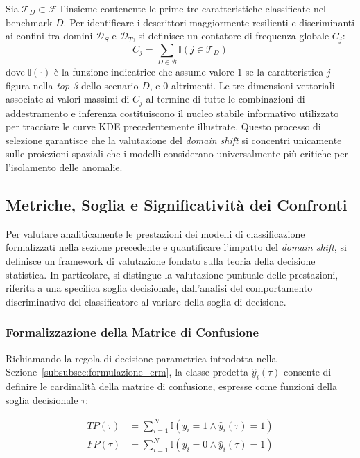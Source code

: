 Sia $\mathcal{T}_D \subset \mathcal{F}$ l'insieme contenente le prime tre caratteristiche classificate nel benchmark $D$. Per identificare i descrittori maggiormente resilienti e discriminanti ai confini tra domini $\mathcal{D}_S$ e $\mathcal{D}_T$, si definisce un contatore di frequenza globale $C_j$:
\begin{equation}
    C_j = \sum_{D \in \mathcal{B}} \mathbb{I}(j \in \mathcal{T}_D)
\end{equation}
dove $\mathbb{I}(\cdot)$ è la funzione indicatrice che assume valore $1$ se la caratteristica $j$ figura nella \textit{top-3} dello scenario $D$, e $0$ altrimenti. 
Le tre dimensioni vettoriali associate ai valori massimi di $C_j$ al termine di tutte le combinazioni di addestramento e inferenza costituiscono il nucleo stabile informativo utilizzato per tracciare le curve KDE precedentemente illustrate. Questo processo di selezione garantisce che la valutazione del \textit{domain shift} si concentri unicamente sulle proiezioni spaziali che i modelli considerano universalmente più critiche per l'isolamento delle anomalie.

\subsection{Metriche, Soglia e Significatività dei Confronti}
\label{subsec:metriche_significativita}

Per valutare analiticamente le prestazioni dei modelli di classificazione formalizzati nella sezione precedente e quantificare l'impatto del \textit{domain shift}, si definisce un framework di valutazione fondato sulla teoria della decisione statistica. In particolare, si distingue la valutazione puntuale delle prestazioni, riferita a una specifica soglia decisionale, dall'analisi del comportamento discriminativo del classificatore al variare della soglia di decisione.

\subsubsection{Formalizzazione della Matrice di Confusione}
\label{subsubsec:decisione_parametrica}
Richiamando la regola di decisione parametrica introdotta nella Sezione~\ref{subsubsec:formulazione_erm}, la classe predetta $\hat{y}_i(\tau)$ consente di definire le cardinalità della matrice di confusione, espresse come funzioni della soglia decisionale $\tau$:

\begin{align}
    TP(\tau) &= \sum_{i=1}^{N} \mathbb{I}(y_i=1 \land \hat{y}_i(\tau)=1) \\
    FP(\tau) &= \sum_{i=1}^{N} \mathbb{I}(y_i=0 \land \hat{y}_i(\tau)=1)
\end{align}

